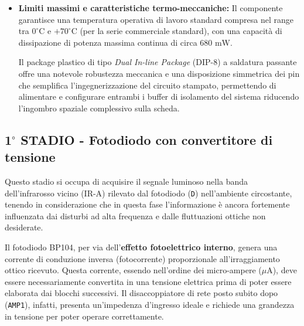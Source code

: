 \documentclass[12pt,a4paper]{article}
\begin{document}
\begin{itemize}
                Questi parametri dinamici assicurano una velocità di risposta eccellente e tempi di assestamento ridotti, traducendosi in una commutazione d'uscita 
                estremamente netta e priva di oscillazioni spurie nel momento in cui il terzo stadio (\texttt{AMP3}) opera in anello aperto come comparatore di soglia.
            
            \item \textbf{Limiti massimi e caratteristiche termo-meccaniche:} Il componente garantisce una temperatura operativa di lavoro standard compresa nel range 
                tra $0^\circ\text{C}$ e $+70^\circ\text{C}$ (per la serie commerciale standard), con una capacità di dissipazione di potenza massima continua di circa $680\text{ mW}$. 
            
                Il package plastico di tipo \textit{Dual In-line Package} (DIP-8) a saldatura passante offre una notevole robustezza meccanica e una disposizione simmetrica dei 
                pin che semplifica l'ingegnerizzazione del circuito stampato, permettendo di alimentare e configurare entrambi i buffer di isolamento del sistema riducendo l'ingombro 
                spaziale complessivo sulla scheda.
        \end{itemize}
    
    \subsection{1$^\circ$ STADIO - Fotodiodo con convertitore di tensione}
        Questo stadio si occupa di acquisire il segnale luminoso nella banda dell'infrarosso vicino (IR-A) rilevato dal fotodiodo
        (\texttt{D}) nell'ambiente circostante, tenendo in considerazione che in questa fase l'informazione è ancora fortemente influenzata
        dai disturbi ad alta frequenza e dalle fluttuazioni ottiche non desiderate.

        Il fotodiodo BP104, per via dell'\textbf{effetto fotoelettrico interno}, genera una corrente di conduzione inversa (fotocorrente)
        proporzionale all'irraggiamento ottico ricevuto. Questa corrente, essendo nell'ordine dei micro-ampere ($\mu\text{A}$), deve essere
        necessariamente convertita in una tensione elettrica prima di poter essere elaborata dai blocchi successivi. Il disaccoppiatore di 
        rete posto subito dopo (\texttt{AMP1}), infatti, presenta un'impedenza d'ingresso ideale e richiede una grandezza in tensione per poter
        operare correttamente.
\end{document}
